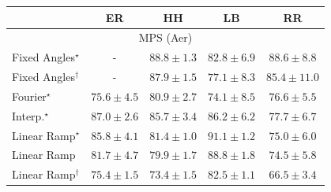 \begin{tabular}{l|cccc|}
\toprule
            & ER & HH & LB & RR \\
\midrule
\multicolumn{5}{c}{\rule{0pt}{8pt}MPS (Aer)} \\
\midrule
Fixed Angles$^\star$ & {\cellcolor[HTML]{000000}} \color[HTML]{F1F1F1} {\cellcolor{white}} \color{black} - & {\cellcolor[HTML]{790D75}} \color[HTML]{F1F1F1} $88.8\pm 1.3$ & {\cellcolor[HTML]{88419D}} \color[HTML]{F1F1F1} $82.8\pm 6.9$ & {\cellcolor[HTML]{7B0D76}} \color[HTML]{F1F1F1} $88.6\pm 8.8$ \\
Fixed Angles$^\dagger$ & {\cellcolor[HTML]{000000}} \color[HTML]{F1F1F1} {\cellcolor{white}} \color{black} - & {\cellcolor[HTML]{81117D}} \color[HTML]{F1F1F1} $87.9\pm 1.5$ & {\cellcolor[HTML]{8C6EB3}} \color[HTML]{F1F1F1} $77.1\pm 8.3$ & {\cellcolor[HTML]{85288D}} \color[HTML]{F1F1F1} $85.4\pm 11.0$ \\
Fourier$^\star$ & {\cellcolor[HTML]{8C7AB8}} \color[HTML]{F1F1F1} $75.6\pm 4.5$ & {\cellcolor[HTML]{8950A4}} \color[HTML]{F1F1F1} $80.9\pm 2.7$ & {\cellcolor[HTML]{8C86BE}} \color[HTML]{F1F1F1} $74.1\pm 8.5$ & {\cellcolor[HTML]{8C72B5}} \color[HTML]{F1F1F1} $76.6\pm 5.5$ \\
Interp.$^\star$ & {\cellcolor[HTML]{821982}} \color[HTML]{F1F1F1} $87.0\pm 2.6$ & {\cellcolor[HTML]{84258B}} \color[HTML]{F1F1F1} $85.7\pm 3.4$ & {\cellcolor[HTML]{832088}} \color[HTML]{F1F1F1} $86.2\pm 6.2$ & {\cellcolor[HTML]{8C69B0}} \color[HTML]{F1F1F1} $77.7\pm 6.7$ \\
Linear Ramp$^\star$ & {\cellcolor[HTML]{84248A}} \color[HTML]{F1F1F1} $85.8\pm 4.1$ & {\cellcolor[HTML]{894CA2}} \color[HTML]{F1F1F1} $81.4\pm 1.0$ & {\cellcolor[HTML]{62065F}} \color[HTML]{F1F1F1} $91.1\pm 1.2$ & {\cellcolor[HTML]{8C80BB}} \color[HTML]{F1F1F1} $75.0\pm 6.0$ \\
Linear Ramp & {\cellcolor[HTML]{8949A1}} \color[HTML]{F1F1F1} $81.7\pm 4.7$ & {\cellcolor[HTML]{8A58A8}} \color[HTML]{F1F1F1} $79.9\pm 1.7$ & {\cellcolor[HTML]{790D75}} \color[HTML]{F1F1F1} $88.8\pm 1.8$ & {\cellcolor[HTML]{8C84BD}} \color[HTML]{F1F1F1} $74.5\pm 5.8$ \\
Linear Ramp$^\dagger$ & {\cellcolor[HTML]{8C7CB9}} \color[HTML]{F1F1F1} $75.4\pm 1.5$ & {\cellcolor[HTML]{8C8CC1}} \color[HTML]{F1F1F1} $73.4\pm 1.5$ & {\cellcolor[HTML]{88439E}} \color[HTML]{F1F1F1} $82.5\pm 1.1$ & {\cellcolor[HTML]{A1BEDB}} \color[HTML]{000000} $66.5\pm 3.4$ \\

\end{tabular}
